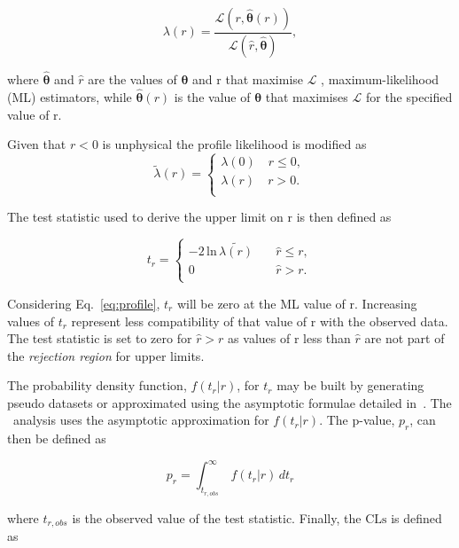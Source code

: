 \begin{equation}
\label{eq:profile}
\lambda(r) = \frac{\mathcal{L}(r,\hat{\boldsymbol{\theta}}(r))}{\mathcal{L}(\hat{r},\hat{\boldsymbol{\theta}})},
\end{equation}

where $\hat{\boldsymbol{\theta}}$ and $\hat{r}$ are the values of $\boldsymbol{\theta}$ and r that maximise $\mathcal{L}$
, maximum-likelihood (ML) estimators, while $\hat{\boldsymbol{\theta}}(r)$ is the value
of $\boldsymbol{\theta}$ that maximises $\mathcal{L}$ for the specified value of r. 

Given that $r < 0$ is unphysical the profile likelihood is modified as
\begin{equation}
\label{eq:profileNew}
\tilde{\lambda}(r) = 
\begin{cases}
\lambda(0)\quad r \le 0, \\ 
\lambda(r)\quad r > 0. \\ 
\end{cases}
\end{equation}

The test statistic used to derive the upper limit on r is then defined as

\begin{equation}
t_r = 
\begin{cases}
-2\,\text{ln}\,\tilde{\lambda(r)}\quad &\hat{r} \le r, \\ 
0 \quad &\hat{r} > r. \\ 
\end{cases}
\end{equation}

Considering Eq.~\ref{eq:profile}, $t_r$ will be zero at the ML value of r.
Increasing values of $t_r$ represent less compatibility of that value of r with
the observed data. The test statistic is set to zero for $\hat{r} > r$ as
values of r less than $\hat{r}$ are not part of the \emph{rejection region} for upper limits. 

The probability density function, $f(t_r|r)$, for $t_r$ may be built by 
generating pseudo datasets or approximated using the asymptotic formulae 
detailed in~\cite{asymp}. The \alphat~analysis uses the asymptotic
approximation for $f(t_r|r)$. The p-value, $p_r$, can then be defined as

\begin{equation}
p_r = \int_{t_{r,obs}}^{\infty}\, f(t_r|r)\, dt_r
\end{equation}

where ${t_{r,obs}}$ is the observed value of the test statistic. Finally,
the $\text{CLs}$ is defined as

